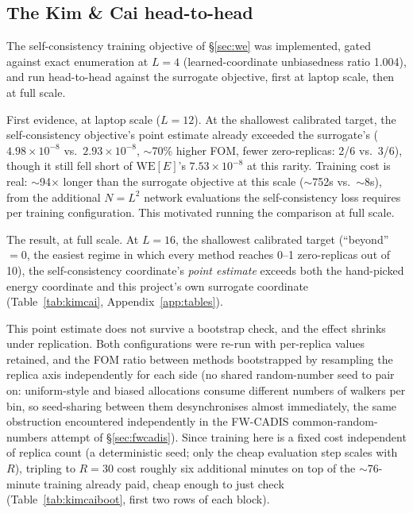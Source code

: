 \documentclass[a4paper,fleqn]{cas-sc}
\let\Oldsubsection\subsection
\renewcommand{\subsection}{\FloatBarrier\Oldsubsection}
\begin{document}
	\subsection{The Kim \& Cai head-to-head}\label{sec:kimcai}
	The self-consistency training objective of \S\ref{sec:we} was implemented, gated
	against exact enumeration at $L=4$ (learned-coordinate unbiasedness ratio 1.004), and run
	head-to-head against the surrogate objective, first at laptop scale, then at full scale.
	
	First evidence, at laptop scale ($L=12$). At the shallowest calibrated target, the
	self-consistency objective's point estimate already exceeded the surrogate's
	($4.98\times10^{-8}$ vs.\ $2.93\times10^{-8}$, $\sim$70\% higher FOM, fewer zero-replicas:
	2/6 vs.\ 3/6), though it still fell short of $\mathrm{WE}[E]$'s $7.53\times10^{-8}$ at this
	rarity. Training cost is real: $\sim$94$\times$ longer than the surrogate objective at this
	scale ($\sim$752s vs.\ $\sim$8s), from the additional $N=L^2$ network evaluations the
	self-consistency loss requires per training configuration. This motivated running the
	comparison at full scale.
	
	The result, at full scale. At $L=16$, the shallowest calibrated target (``beyond''\,$=0$,
	the easiest regime in which every method reaches 0--1 zero-replicas out of 10), the
	self-consistency coordinate's \emph{point estimate} exceeds both the hand-picked energy
	coordinate and this project's own surrogate coordinate (Table~\ref{tab:kimcai},
	Appendix~\ref{app:tables}).
	
	This point estimate does not survive a bootstrap check, and the effect shrinks
	under replication. Both configurations were re-run with per-replica values retained, and
	the FOM ratio between methods bootstrapped by resampling the replica axis independently for
	each side (no shared random-number seed to pair on: uniform-style and biased allocations
	consume different numbers of walkers per bin, so seed-sharing between them desynchronises
	almost immediately, the same obstruction encountered independently in the FW-CADIS
	common-random-numbers attempt of \S\ref{sec:fwcadis}). Since training here is a fixed cost
	independent of replica count (a deterministic seed; only the cheap evaluation step scales
	with $R$), tripling to $R=30$ cost roughly six additional minutes on top of the
	$\sim$76-minute training already paid, cheap enough to just check
	(Table~\ref{tab:kimcaiboot}, first two rows of each block).
	
\end{document}
